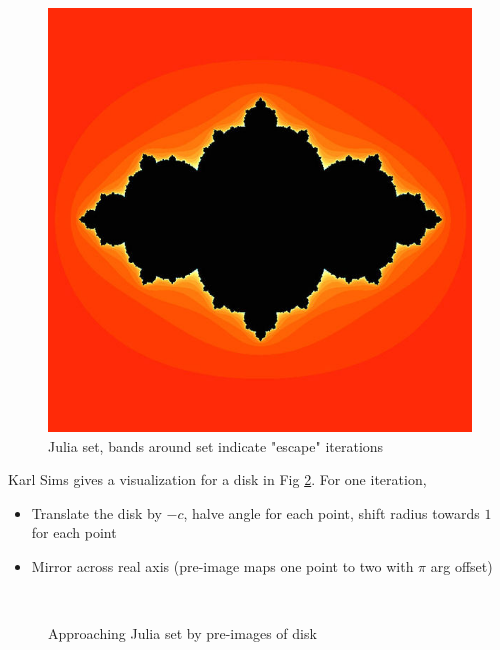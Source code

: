\documentclass{article}
\begin{document}
\begin{figure}[h!]
    \centering
    \includegraphics[width=.4\linewidth]{600px-Time_escape_Julia_set.jpg}
    \caption{Julia set, bands around set indicate "escape" iterations \cite{JuliaTimeEscape}}
    \label{fig:julia_escape}
\end{figure}

Karl Sims gives a visualization for a disk in Fig \ref{fig:karlsims_preimage}. For one iteration,
\begin{itemize}
    \item Translate the disk by $-c$, halve angle for each point, shift radius towards $1$ for each point
    \item Mirror across real axis (pre-image maps one point to two with $\pi$ arg offset)
\end{itemize}

\begin{figure}[htbp!]
    \setlength{\abovecaptionskip}{0pt}
    \captionsetup[subfigure]{labelformat=empty}
    \centering
     \\[-3ex]%
    \caption{Approaching Julia set by pre-images of disk \cite{KarlSims}} %
    \label{fig:karlsims_preimage}%
\end{figure}%
\end{document}
